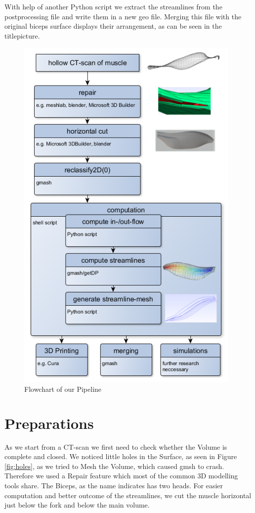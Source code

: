 \documentclass[preprint,journal]{vgtc}       %
\begin{document}
With help of another Python script we extract the streamlines from the postprocessing file and write them in a new geo file. 
Merging this file with the original biceps surface displays their arrangement, as can be seen in the titlepicture.
\begin{figure}
	\begin{center}
		\includegraphics[width=.7\linewidth]{flow.png}
	\end{center}
	\caption{Flowchart of our Pipeline}
	\label{fig:flow}
	
\end{figure}
\section{Preparations}
As we start from a CT-scan we first need to check whether the Volume is complete and closed. 
We noticed little holes in the Surface, as seen  in Figure \ref{fig:holes}, as we tried to Mesh the Volume, which caused gmsh to crash. 
Therefore we used a Repair feature which most of the common 3D modelling tools share. 
The Biceps, as the name indicates has two heads. 
For easier computation and better outcome of the streamlines, we cut  the muscle horizontal just below the fork and below the main volume. 
\end{document}
